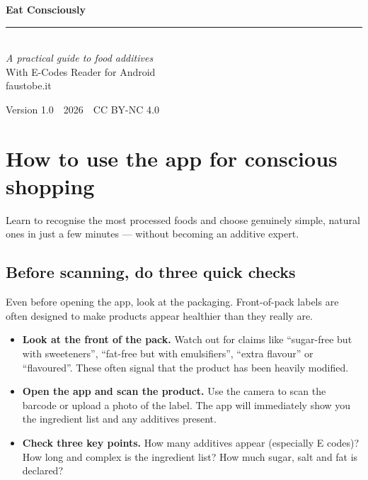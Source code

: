 \documentclass[a5paper,12pt,oneside,openany]{book}
\begin{document}
\begin{titlepage}
\pagecolor{verdescuro}
\color{white}
\vspace*{2.5cm}
\begin{center}
  {\fontsize{38}{44}\selectfont\bfseries Eat Consciously}\\[1.2cm]
  \textcolor{verdecharo}{\rule{6cm}{0.6pt}}\\[1.2cm]
  {\large\itshape A practical guide to food additives}\\[0.6cm]
  {\normalsize With E-Codes Reader for Android}\\[3cm]
  {\normalsize\textcolor{verdecharo}{faustobe.it}}
\end{center}
\vfill
\begin{center}
  {\small Version 1.0\ \textbullet\ 2026\ \textbullet\ CC BY-NC 4.0}
\end{center}
\end{titlepage}
\nopagecolor

\frontmatter
\tableofcontents
\mainmatter

\chapter{How to use the app for conscious shopping}

Learn to recognise the most processed foods and choose genuinely simple,
natural ones in just a few minutes --- without becoming an additive expert.

\section{Before scanning, do three quick checks}

Even before opening the app, look at the packaging. Front-of-pack labels
are often designed to make products appear healthier than they really are.

\begin{itemize}
  \item \textbf{Look at the front of the pack.} Watch out for claims like
    ``sugar-free but with sweeteners'', ``fat-free but with emulsifiers'',
    ``extra flavour'' or ``flavoured''. These often signal that the product
    has been heavily modified.
  \item \textbf{Open the app and scan the product.} Use the camera to scan
    the barcode or upload a photo of the label. The app will immediately
    show you the ingredient list and any additives present.
  \item \textbf{Check three key points.} How many additives appear
    (especially E codes)? How long and complex is the ingredient list?
    How much sugar, salt and fat is declared?
\end{itemize}
\end{document}
